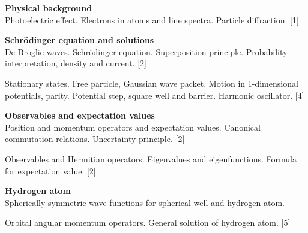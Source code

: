 \documentclass[a4paper]{article}
\begin{document}
\maketitle
{\small
\noindent\textbf{Physical background}\\
Photoelectric effect. Electrons in atoms and line spectra. Particle diffraction.\hspace*{\fill} [1]

\vspace{10pt}
\noindent\textbf{Schr\"odinger equation and solutions}\\
De Broglie waves. Schr\"odinger equation. Superposition principle. Probability interpretation, density and current.\hspace*{\fill} [2]

\vspace{5pt}
\noindent Stationary states. Free particle, Gaussian wave packet. Motion in 1-dimensional potentials, parity. Potential step, square well and barrier. Harmonic oscillator.\hspace*{\fill} [4]

\vspace{10pt}
\noindent\textbf{Observables and expectation values}\\
Position and momentum operators and expectation values. Canonical commutation relations. Uncertainty principle.\hspace*{\fill} [2]

\vspace{5pt}
\noindent Observables and Hermitian operators. Eigenvalues and eigenfunctions. Formula for expectation value.\hspace*{\fill} [2]

\vspace{10pt}
\noindent\textbf{Hydrogen atom}\\
Spherically symmetric wave functions for spherical well and hydrogen atom.

\vspace{5pt}
\noindent Orbital angular momentum operators. General solution of hydrogen atom.\hspace*{\fill} [5]}

\tableofcontents
\setcounter{section}{-1}
\end{document}
